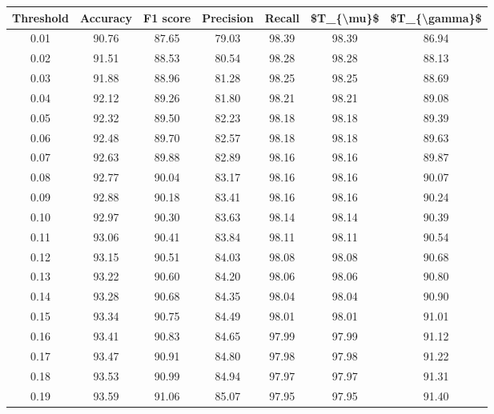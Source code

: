 \begin{tabular}{|c|c|c|c|c|c|c|}
\hline
 Threshold &  Accuracy &  F1 score &  Precision &  Recall &  \$T\_\{\textbackslash mu\}\$ &  \$T\_\{\textbackslash gamma\}\$ \\
\hline
      0.01 &     90.76 &     87.65 &      79.03 &   98.39 &      98.39 &         86.94 \\
      0.02 &     91.51 &     88.53 &      80.54 &   98.28 &      98.28 &         88.13 \\
      0.03 &     91.88 &     88.96 &      81.28 &   98.25 &      98.25 &         88.69 \\
      0.04 &     92.12 &     89.26 &      81.80 &   98.21 &      98.21 &         89.08 \\
      0.05 &     92.32 &     89.50 &      82.23 &   98.18 &      98.18 &         89.39 \\
      0.06 &     92.48 &     89.70 &      82.57 &   98.18 &      98.18 &         89.63 \\
      0.07 &     92.63 &     89.88 &      82.89 &   98.16 &      98.16 &         89.87 \\
      0.08 &     92.77 &     90.04 &      83.17 &   98.16 &      98.16 &         90.07 \\
      0.09 &     92.88 &     90.18 &      83.41 &   98.16 &      98.16 &         90.24 \\
      0.10 &     92.97 &     90.30 &      83.63 &   98.14 &      98.14 &         90.39 \\
      0.11 &     93.06 &     90.41 &      83.84 &   98.11 &      98.11 &         90.54 \\
      0.12 &     93.15 &     90.51 &      84.03 &   98.08 &      98.08 &         90.68 \\
      0.13 &     93.22 &     90.60 &      84.20 &   98.06 &      98.06 &         90.80 \\
      0.14 &     93.28 &     90.68 &      84.35 &   98.04 &      98.04 &         90.90 \\
      0.15 &     93.34 &     90.75 &      84.49 &   98.01 &      98.01 &         91.01 \\
      0.16 &     93.41 &     90.83 &      84.65 &   97.99 &      97.99 &         91.12 \\
      0.17 &     93.47 &     90.91 &      84.80 &   97.98 &      97.98 &         91.22 \\
      0.18 &     93.53 &     90.99 &      84.94 &   97.97 &      97.97 &         91.31 \\
      0.19 &     93.59 &     91.06 &      85.07 &   97.95 &      97.95 &         91.40 \\

\end{tabular}
